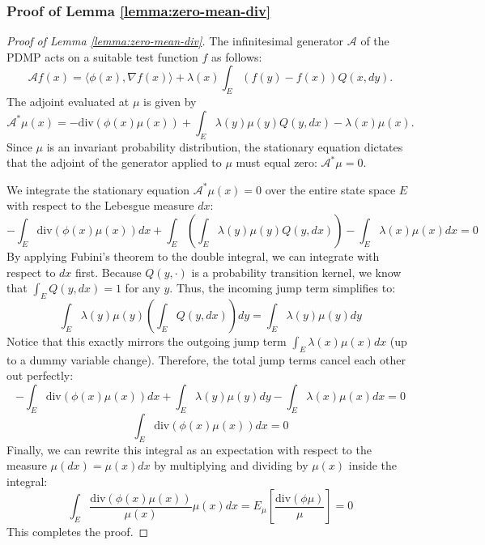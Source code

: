 \documentclass{article}
\begin{document}
\subsubsection{Proof of Lemma \ref{lemma:zero-mean-div}}
\begin{proof}[Proof of Lemma \ref{lemma:zero-mean-div}]
    
    The infinitesimal generator $\mathcal{A}$ of the PDMP acts on a suitable test function $f$ as follows:
    \[
        \mathcal{A}f(x) = \langle \phi(x), \nabla f(x) \rangle + \lambda(x) \int_E (f(y) - f(x)) Q(x, dy).
    \]
    The adjoint evaluated at $\mu$ is given by
    \[
        \mathcal{A}^*\mu(x) = -\text{div}(\phi(x)\mu(x)) + \int_E \lambda(y) \mu(y) Q(y, dx) - \lambda(x)\mu(x).
    \]
    Since $\mu$ is an invariant probability distribution, the stationary equation dictates that the adjoint of the generator applied to $\mu$ must equal zero: $\mathcal{A}^*\mu = 0$. 
        
    We integrate the stationary equation $\mathcal{A}^*\mu(x) = 0$ over the entire state space $E$ with respect to the Lebesgue measure $dx$:
    \[
        -\int_E \text{div}(\phi(x)\mu(x)) dx + \int_E \left( \int_E \lambda(y) \mu(y) Q(y, dx) \right) - \int_E \lambda(x)\mu(x) dx = 0
    \]
    By applying Fubini's theorem to the double integral, we can integrate with respect to $dx$ first. Because $Q(y, \cdot)$ is a probability transition kernel, we know that $\int_E Q(y, dx) = 1$ for any $y$. Thus, the incoming jump term simplifies to:
    \[
        \int_E \lambda(y) \mu(y) \left( \int_E Q(y, dx) \right) dy = \int_E \lambda(y) \mu(y) dy
    \]
    Notice that this exactly mirrors the outgoing jump term $\int_E \lambda(x)\mu(x) dx$ (up to a dummy variable change). Therefore, the total jump terms cancel each other out perfectly:
    \[
        -\int_E \text{div}(\phi(x)\mu(x)) dx + \int_E \lambda(y) \mu(y) dy - \int_E \lambda(x)\mu(x) dx = 0
    \]
    \[
        \int_E \text{div}(\phi(x)\mu(x)) dx = 0
    \]
    Finally, we can rewrite this integral as an expectation with respect to the measure $\mu(dx) = \mu(x) dx$ by multiplying and dividing by $\mu(x)$ inside the integral:
    \[
        \int_E \frac{\text{div}(\phi(x)\mu(x))}{\mu(x)} \mu(x) dx = E_\mu\left[\frac{\text{div}(\phi \mu)}{\mu}\right] = 0
    \]
    This completes the proof.
\end{proof}
\end{document}

